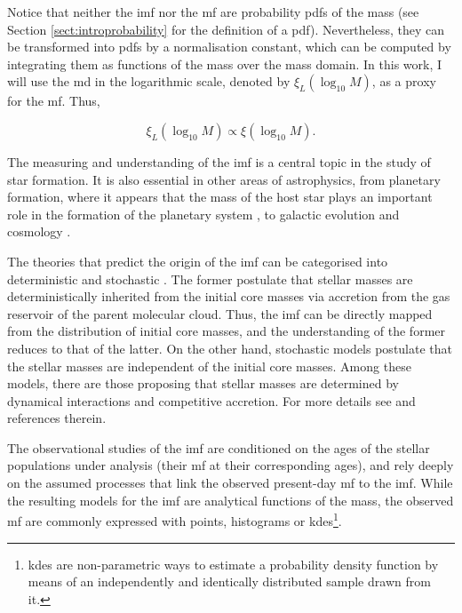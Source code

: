 Notice that neither the \gls{imf} nor the \gls{mf} are probability \glspl{pdf} of the mass (see Section \ref{sect:introprobability} for the definition of a \gls{pdf}). Nevertheless, they can be transformed into \glspl{pdf} by a normalisation constant, which can be computed by integrating them as functions of the mass over the mass domain. In this work, I will use the \gls{md} in the logarithmic scale, denoted by $\xi_L (\log_{10}M)$, as a proxy for the \gls{mf}. Thus,

\begin{equation}
\xi_L (\log_{10} M) \propto \xi (\log_{10} M).\nonumber
\end{equation}

The measuring and understanding of the \gls{imf} is a central topic in the study of star formation. It is also essential in other areas of astrophysics, from planetary formation, where it appears that the mass of the host star plays an important role in the formation of the planetary system \cite[see for example][]{2015ApJ...814..130M}, to galactic evolution \citep{1998ASPC..142....1K} and cosmology \cite[see for example][]{2012MNRAS.423.3601N}. 

The theories that predict the origin of the \gls{imf} can be categorised into deterministic and stochastic \citep{Offner2014}. The former postulate that stellar masses are deterministically inherited from the initial core masses via accretion from the gas reservoir of the parent molecular cloud. Thus, the \gls{imf} can be directly mapped from the distribution of initial core masses, and the understanding of the former reduces to that of the latter. On the other hand, stochastic models postulate that the stellar masses are independent of the initial core masses. Among these models, there are those proposing that stellar masses are determined by dynamical interactions and competitive accretion. For more details see \citet{Offner2014} and references therein. 

  The observational studies of the \gls{imf} are conditioned on the ages of the stellar populations under analysis (their \gls{mf} at their corresponding ages), and rely deeply on the assumed processes that link the observed present-day \gls{mf} to the \gls{imf}. While the resulting models for the \gls{imf} are analytical functions of the mass, the observed \gls{mf} are commonly expressed with points, histograms or \glspl{kde}\footnote{\glspl{kde} are non-parametric ways to estimate a probability density function by means of an independently and identically distributed sample drawn from it.}.

